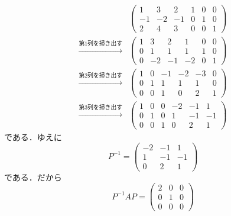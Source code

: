 \documentclass[uplatex,dvipdfmx,a4paper,10pt,fleqn]{jsarticle}
\begin{document}
    \begin{leftbar}
    \begin{align*} 
    &
    \left( 
        \begin{array}{ccc|ccc}
        1 & 3 & 2 & 1 & 0 & 0 \\
        -1 & -2 & -1 & 0 & 1 & 0 \\
        2 & 4 & 3 &  0 & 0 & 1
        \end{array}
        \right) \\
       \xrightarrow{\text{第$1$列を掃き出す}} &
    \left( 
        \begin{array}{ccc|ccc}
        1 & 3 & 2 & 1 & 0 & 0 \\
        0 & 1 & 1 & 1 & 1 & 0 \\
        0 & -2 & -1 &  -2 & 0 & 1
        \end{array}
        \right) \\
       \xrightarrow{\text{第$2$列を掃き出す}} &
       \left( 
           \begin{array}{ccc|ccc}
           1 & 0 & -1 & -2 & -3 & 0 \\
           0 & 1 & 1 & 1 & 1 & 0 \\
           0 & 0 & 1 &  0 & 2 & 1 
           \end{array}
           \right) \\
       \xrightarrow{\text{第$3$列を掃き出す}} &
       \left( 
           \begin{array}{ccc|ccc}
            1 & 0 & 0 & -2 & -1 & 1 \\
            0 & 1 & 0 & 1 & -1 & -1 \\
            0 & 0 & 1 &  0 & 2 & 1 
           \end{array}
           \right) 
        \end{align*}
        である．ゆえに
        \[
            P^{-1} = \begin{pmatrix} -2 & -1 & 1\\ 1 & -1 & -1 \\ 0 & 2 & 1 \end{pmatrix}
        \]
        である．だから
        \[
            P^{-1} A P = \begin{pmatrix} 2 & 0 & 0 \\ 0 & 1 & 0 \\ 0 & 0 & 0 \end{pmatrix}
        \]
    \end{leftbar}

    \newpage 
\end{document}
